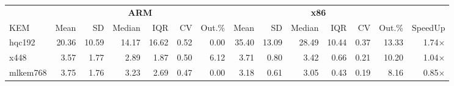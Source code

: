 \begin{table}[!ht]
\centering
\begin{tabular}{l|rrrrrr|rrrrrr|r}
\toprule
& \multicolumn{6}{c}{\bfseries ARM} & \multicolumn{6}{c}{\bfseries x86} & \\
\cmidrule(lr){2-7} \cmidrule(lr){8-13}
KEM & Mean & SD & Median & IQR & CV & Out.\% & Mean & SD & Median & IQR & CV & Out.\% & SpeedUp \\
\midrule
hqc192 & 20.36 & 10.59 & 14.17 & 16.62 & 0.52 & 0.00 & 35.40 & 13.09 & 28.49 & 10.44 & 0.37 & 13.33 & 1.74× \\
x448 & 3.57 & 1.77 & 2.89 & 1.87 & 0.50 & 6.12 & 3.71 & 0.80 & 3.42 & 0.66 & 0.21 & 10.20 & 1.04× \\
mlkem768 & 3.75 & 1.76 & 3.23 & 2.69 & 0.47 & 0.00 & 3.18 & 0.61 & 3.05 & 0.43 & 0.19 & 8.16 & 0.85× \\
\bottomrule
\end{tabular}
\end{table}
